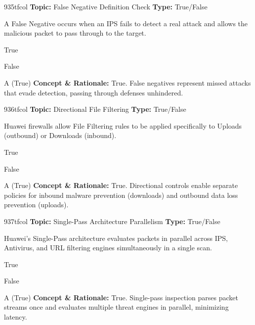 \begin{qcard}{935}{tfcol}
\textcolor{darkslate!75}{\small\textbf{Topic:} False Negative Definition Check \hfill \textbf{Type:} True/False}\vspace{0.4em}\par
A False Negative occurs when an IPS fails to detect a real attack and allows the malicious packet to pass through to the target.
\begin{qoptions}
\item True
\item False
\end{qoptions}
\end{qcard}
\nopagebreak
\begin{explainbox}{A (True)}
\textbf{Concept \& Rationale:} True. False negatives represent missed attacks that evade detection, passing through defenses unhindered.
\end{explainbox}

\begin{qcard}{936}{tfcol}
\textcolor{darkslate!75}{\small\textbf{Topic:} Directional File Filtering \hfill \textbf{Type:} True/False}\vspace{0.4em}\par
Huawei firewalls allow File Filtering rules to be applied specifically to Uploads (outbound) or Downloads (inbound).
\begin{qoptions}
\item True
\item False
\end{qoptions}
\end{qcard}
\nopagebreak
\begin{explainbox}{A (True)}
\textbf{Concept \& Rationale:} True. Directional controls enable separate policies for inbound malware prevention (downloads) and outbound data loss prevention (uploads).
\end{explainbox}

\begin{qcard}{937}{tfcol}
\textcolor{darkslate!75}{\small\textbf{Topic:} Single-Pass Architecture Parallelism \hfill \textbf{Type:} True/False}\vspace{0.4em}\par
Huawei's Single-Pass architecture evaluates packets in parallel across IPS, Antivirus, and URL filtering engines simultaneously in a single scan.
\begin{qoptions}
\item True
\item False
\end{qoptions}
\end{qcard}
\nopagebreak
\begin{explainbox}{A (True)}
\textbf{Concept \& Rationale:} True. Single-pass inspection parses packet streams once and evaluates multiple threat engines in parallel, minimizing latency.
\end{explainbox}

